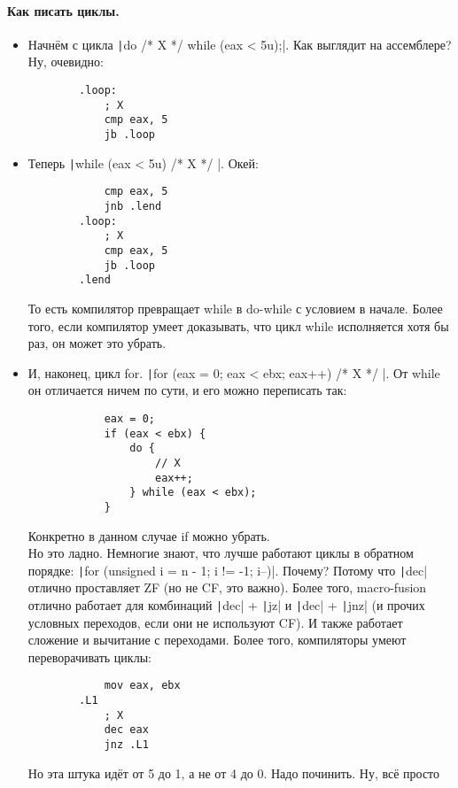 \documentclass{article}
\begin{document}
    \paragraph{Как писать циклы.}
    \begin{itemize}
        \item Начнём с цикла \texttt|do { /* X */ } while (eax < 5u);|. Как выглядит на ассемблере? Ну, очевидно:
        \begin{verbatim}
        .loop:
            ; X
            cmp eax, 5
            jb .loop
        \end{verbatim}
        \item Теперь \texttt|while (eax < 5u) { /* X */ }|. Окей:
        \begin{verbatim}
            cmp eax, 5
            jnb .lend
        .loop:
            ; X
            cmp eax, 5
            jb .loop
        .lend
        \end{verbatim}
        То есть компилятор превращает while в do-while с условием в начале. Более того, если компилятор умеет доказывать, что цикл while исполняется хотя бы раз, он может это убрать.
        \item И, наконец, цикл for. \texttt|for (eax = 0; eax < ebx; eax++) { /* X */ }|. От while он отличается ничем по сути, и его можно переписать так:
        \begin{verbatim}
            eax = 0;
            if (eax < ebx) {
                do {
                    // X
                    eax++;
                } while (eax < ebx);
            }
        \end{verbatim}
        Конкретно в данном случае if можно убрать.\\
        Но это ладно. Немногие знают, что лучше работают циклы в обратном порядке: \texttt|for (unsigned i = n - 1; i != -1; i--)|. Почему? Потому что \texttt|dec| отлично проставляет ZF (но не CF, это важно). Более того, macro-fusion отлично работает для комбинаций \texttt|dec| + \texttt|jz| и \texttt|dec| + \texttt|jnz| (и прочих условных переходов, если они не используют CF). И также работает сложение и вычитание с переходами. Более того, компиляторы умеют переворачивать циклы:
        \begin{verbatim}
            mov eax, ebx
        .L1
            ; X
            dec eax
            jnz .L1
        \end{verbatim}
        Но эта штука идёт от 5 до 1, а не от 4 до 0. Надо починить. Ну, всё просто

\end{itemize}
\end{document}
